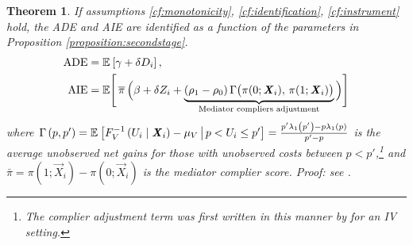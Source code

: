 \newtheorem{theoremCF}{Theorem}
\renewcommand\thetheoremCF{CF}
\begin{theoremCF}
    \label{thm:cf-identification}
    If assumptions \ref{cf:monotonicity}, \ref{cf:identification}, \ref{cf:instrument} hold, the ADE and AIE are identified as a function of the parameters in Proposition \ref{proposition:secondstage}.
    \begin{align*}
    \text{ADE}
        &= \mathbb{E}_{} \left[ \gamma + \delta D_i \right], \\
    \text{AIE}
        &= \mathbb E \Bigg[ \, \overline{\pi} \,
            \Big( \beta +  \delta Z_i +
                \underbrace{ (\rho_1 - \rho_0) \,
                \Gamma \big(\pi(0; \boldsymbol{\mathit{X}}_i), \, \pi(1; \boldsymbol{\mathit{X}}_i) \big)}_{
                    \text{Mediator compliers adjustment}} \Big) \Bigg]
    \end{align*}
    where $\Gamma\left(p,p'\right) 
    = \mathbb{E}_{} \left[  F_V^{-1}\left( U_i \mid \boldsymbol{\mathit{X}}_i \right) - \mu_V \, \middle\vert \, p < U_i \leq p' \right]
    = \frac{p'\lambda_1\left(p'\right) - p\lambda_1\left(p\right)}{p' - p}$ is the average unobserved net gains for those with unobserved costs between $p < p'$,\footnote{
        The complier adjustment term was first written in this manner by \cite{kline2019heckits} for an IV setting.
    } and $\bar\pi = \pi(1; \vec X_i) - \pi(0; \vec X_i)$ is the mediator complier score.
    Proof: see .
\end{theoremCF}

